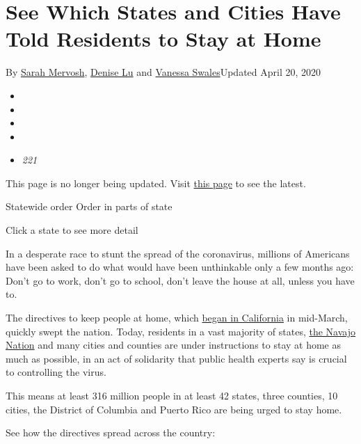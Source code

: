 \hypertarget{see-which-states-and-cities-have-told-residents-to-stay-at-home}{%
\section{See Which States and Cities Have Told Residents to Stay at
Home}\label{see-which-states-and-cities-have-told-residents-to-stay-at-home}}

By \href{https://www.nytimes3xbfgragh.onion/by/sarah-mervosh}{Sarah
Mervosh}, \href{https://www.nytimes3xbfgragh.onion/by/denise-lu}{Denise
Lu} and
\href{https://www.nytimes3xbfgragh.onion/by/vanessa-swales}{Vanessa
Swales}Updated April 20, 2020

\begin{itemize}
\item
\item
\item
\item
\item
  \emph{221}
\end{itemize}

This page is no longer being updated. Visit
\href{https://www.nytimes3xbfgragh.onion/interactive/2020/us/states-reopen-map-coronavirus.html}{this
page} to see the latest.

 Statewide order Order in parts of state

Click a state to see more detail

In a desperate race to stunt the spread of the coronavirus, millions of
Americans have been asked to do what would have been unthinkable only a
few months ago: Don't go to work, don't go to school, don't leave the
house at all, unless you have to.

The directives to keep people at home, which
\href{https://www.nytimes3xbfgragh.onion/2020/03/20/us/coronavirus-california-stay-at-home-order.html}{began
in California} in mid-March, quickly swept the nation. Today, residents
in a vast majority of states,
\href{https://navajotimes.com/reznews/covid-cases-now-at-29-people-not-heeding-stay-at-home-warning/}{the
Navajo Nation} and many cities and counties are under instructions to
stay at home as much as possible, in an act of solidarity that public
health experts say is crucial to controlling the virus.

This means at least 316 million people in at least 42 states, three
counties, 10 cities, the District of Columbia and Puerto Rico are being
urged to stay home.

See how the directives spread across the country:

